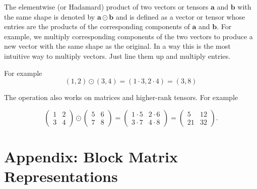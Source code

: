 The elementwise (or Hadamard) product of two vectors or tensors $\mathbf{a}$ and $\mathbf{b}$ with the same shape is denoted by $\mathbf{a} \odot \mathbf{b}$ and is defined as a vector or tensor whose entries are the products of the corresponding components of $\mathbf{a}$  and $\mathbf{b}$. For example, we multiply corresponding components of the two vectors to produce a new vector with the same shape as the original. In a way this is the most intuitive way to multiply vectors. Just line them up and multiply entries.

For example
\begin{equation}
(1,2) \odot (3,4) = (1 \cdot 3,  2 \cdot 4) =  (3,8)
\end{equation}

The operation also works on matrices and higher-rank tensors. For example

\begin{equation}
\begin{pmatrix} 1 & 2 \\ 3 & 4 \end{pmatrix} \odot \begin{pmatrix} 5 & 6 \\ 7 & 8 \end{pmatrix} = \begin{pmatrix} 1 \cdot 5 & 2 \cdot 6 \\ 3 \cdot 7 & 4 \cdot 8 \end{pmatrix} = \begin{pmatrix} 5 & 12 \\ 21 & 32 \end{pmatrix}.
\end{equation}


\section{Appendix: Block Matrix Representations}

